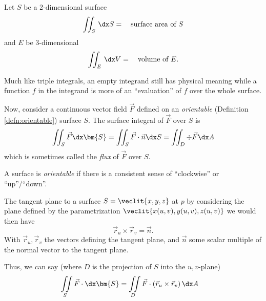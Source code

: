 \documentclass{article}
\begin{document}
Let $S$ be a 2-dimensional surface
\[ \iint_{S} \, \dx S = \quad \text{surface area of $S$} \]
and $E$ be 3-dimensional
\[ \iint_{E} \, \dx V = \quad \text{volume of $E$}. \]

Much like triple integrals, an empty integrand still has physical meaning while a function $f$ in the integrand is more
of an ``evaluation'' of $f$ over the whole surface.

Now, consider a continuous vector field $\vec{F}$ defined on an \emph{orientable} (Definition \ref{defn:orientable}) surface $S$.
The surface integral of $\vec{F}$ over $S$ is
\[ \iint_{S} \vec{F} \dx \bm{S} = \iint_{S} \vec{F} \cdot \vec{n} \dx S = \iint_{D} \div \vec{F} \dx A \]
which is sometimes called the \emph{flux} of $\vec{F}$ over $S$.

\begin{defn}\label{defn:orientable}
  A surface is \emph{orientable} if there is a consistent sense of ``clockwise'' or ``up''/``down''.
\end{defn}

\begin{remark}
  The tangent plane to a surface $S = \veclit{x, y, z}$ at $p$ by considering the plane defined by
  the parametrization $\veclit{x(u, v), y(u, v), z(u, v)}$ we would then have
  \[ \vec{r}_{u} \times \vec{r}_{v} = \vec{n}. \]
  With $\vec{r}_{u}, \vec{r}_{v}$ the vectors defining the tangent plane, and
  $\vec{n}$ some scalar multiple of the normal vector to the tangent plane.
\end{remark}

Thus, we can say (where $D$ is the projection of $S$ into the $u,v$-plane)
\begin{align*}
  \iint\limits_{S} \vec{F} \cdot \dx \bm{S} &= \iint\limits_{D} \vec{F} \cdot (\vec{r}_{u} \times \vec{r}_{v}) \, \dx A
\end{align*}
\end{document}
